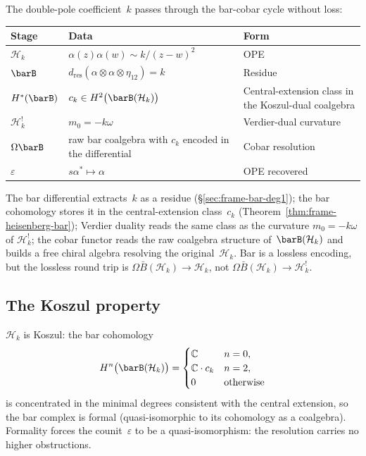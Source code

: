 The double-pole coefficient~$k$ passes through the bar-cobar
cycle without loss:
\begin{center}
\small
\renewcommand{\arraystretch}{1.3}
\begin{tabular}{@{}lll@{}}
\textbf{Stage} & \textbf{Data} & \textbf{Form} \\
\hline
$\mathcal{H}_k$ &
 $\alpha(z)\alpha(w) \sim k/(z{-}w)^2$ &
 OPE \\
$\barB$ &
 $d_{\mathrm{res}}(\alpha{\otimes}\alpha{\otimes}\eta_{12})
 = k$ &
 Residue \\
$H^*(\barB)$ &
 $c_k \in H^2\bigl(\barB(\mathcal{H}_k)\bigr)$ &
 Central-extension class in the Koszul-dual coalgebra \\
$\mathcal H_k^!$ &
 $m_0 = -k\omega$ &
 Verdier-dual curvature \\
$\Omega\barB$ &
 raw bar coalgebra with $c_k$ encoded in the differential &
 Cobar resolution \\
$\varepsilon$ &
 $s\alpha^* \mapsto \alpha$ &
 OPE recovered
\end{tabular}
\end{center}
\noindent
The bar differential extracts~$k$ as a residue
(\S\ref{sec:frame-bar-deg1}); the bar cohomology stores it
in the central-extension class~$c_k$
(Theorem~\ref{thm:frame-heisenberg-bar}); Verdier duality reads
the same class as the curvature $m_0=-k\omega$ of
$\mathcal H_k^!$; the cobar functor reads the raw coalgebra
structure of~$\barB(\mathcal{H}_k)$ and builds a free chiral
algebra resolving the original~$\mathcal{H}_k$. Bar is a
lossless encoding, but the lossless round trip is
$\Omega\bar B(\mathcal H_k)\to\mathcal H_k$, not
$\Omega\bar B(\mathcal H_k)\to\mathcal H_k^!$.

\subsection{The Koszul property}

$\mathcal{H}_k$ is Koszul: the bar cohomology
\[
H^n\bigl(\barB(\mathcal{H}_k)\bigr) =
\begin{cases}
\mathbb{C} & n = 0, \\
\mathbb{C} \cdot c_k & n = 2, \\
0 & \text{otherwise}
\end{cases}
\]
is concentrated in the minimal degrees consistent with the
central extension, so the bar complex is formal
(quasi-isomorphic to its cohomology as a coalgebra).
Formality forces the counit~$\varepsilon$ to be
a quasi-isomorphism: the resolution carries no higher
obstructions.

